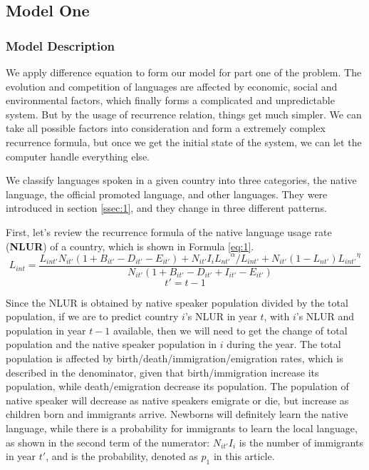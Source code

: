 \documentclass{mcmthesis}
\begin{document}
\subsection{Model One}
\subsubsection{Model Description}
We apply difference equation to form our model for part one of the problem. The evolution and competition of languages are affected by economic, social and environmental factors, which finally forms a complicated and unpredictable system. But by the usage of recurrence relation, things get much simpler. We can take all possible factors into consideration and form a extremely complex recurrence formula, but once we get the initial state of the system, we can let the computer handle everything else.

We classify languages spoken in a given country into three categories, the native language, the official promoted language, and other languages. They were introduced in section \ref{ssec:1}, and they change in three different patterns.

First, let's review the recurrence formula of the native language usage rate (\textbf{NLUR}) of a country, which is shown in Formula \ref{eq:1}.
\begin{equation} \label{eq:1}
    L_{int} = \frac{L_{int'}N_{it'}(1+B_{it'}-D_{it'}-E_{it'})+N_{it'}I_i{L_{nt'}}^\alpha/L_{int'}+N_{it'}(1-L_{nt'}){L_{int'}}^\eta}{N_{it'}(1+B_{it'}-D_{it'}+I_{it'}-E_{it'})}
\end{equation}
\begin{equation*}
    t'=t-1
\end{equation*}


Since the NLUR is obtained by native speaker population divided by the total population, if we are to predict country $i$'s NLUR in year $t$, with $i$'s NLUR and population in year $t-1$ available, then we will need to get the change of total population and the native speaker population in $i$ during the year. The total population is affected by birth/death/immigration/emigration rates, which is described in the denominator, given that birth/immigration increase its population, while death/emigration decrease its population. The population of native speaker will decrease as native speakers emigrate or die, but increase as children born and immigrants arrive. Newborns will definitely learn the native language, while there is a probability for immigrants to learn the local language, as shown in the second term of the numerator: $N_{it'}I_i$ is the number of immigrants in year $t'$, and  is the probability, denoted as $p_1$ in this article.
\end{document}
